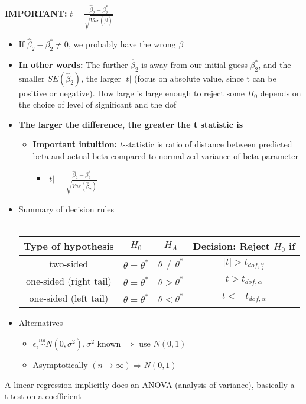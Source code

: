 \documentclass[10pt, oneside]{article}
\begin{document}
\textbf{IMPORTANT:} $t = \frac{\hat \beta_2 - \beta^* _2}{\sqrt{Var(\hat \beta)}}$
\begin{itemize}
    \item If $\hat \beta_2 - \beta_2^* \neq 0$, we probably have the wrong $\beta$
    \item \textbf{In other words:} The further $\hat \beta_2$ is away from our initial guess $\beta_2 ^*$, and the smaller $SE(\hat \beta_2)$, the larger $|t|$ (focus on absolute value, since t can be positive or negative). How large is large enough to reject some $H_0$ depends on the choice of level of significant and the dof
    \item \textbf{The larger the difference, the greater the t statistic is}
    \begin{itemize}
        \item \textbf{Important intuition:} $t$-statistic is ratio of distance between predicted beta and actual beta compared to normalized variance of beta parameter
        \begin{itemize}
            \item $|t| = \frac{\hat \beta_2 -\beta_2 ^*}{\sqrt{Var(\hat \beta_2)}}$
        \end{itemize}
    \end{itemize}
    \item Summary of decision rules\\\\
    \begin{tabular}{|c|c|c|c|}
        \hline
        Type of hypothesis & $H_0$ & $H_A$ & Decision: Reject $H_0$ if \\
        \hline
        two-sided & $\theta = \theta^*$ & $\theta \neq \theta^*$ & $|t| > t_{dof, \frac{\alpha}{2}}$\\
        \hline
        one-sided (right tail) & $\theta = \theta^*$ & $\theta > \theta^*$ & $t > t_{dof, \alpha}$\\
        \hline
        one-sided (left tail)& $\theta = \theta^*$ & $\theta < \theta^*$ & $t < -t_{dof, \alpha}$\\
        \hline
    \end{tabular}
    \item Alternatives
    \begin{itemize}
        \item $\epsilon_i \overset{iid}{\sim} N(0, \sigma^2), \sigma^2$ known $\Rightarrow$ use $N(0,1)$
        \item Asymptotically $(n\rightarrow \infty) \Rightarrow N(0,1)$
    \end{itemize}
\end{itemize}
A linear regression implicitly does an ANOVA (analysis of variance), basically a t-test on a coefficient
\end{document}
